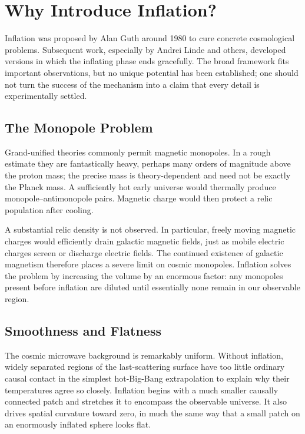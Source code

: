 \section{Why Introduce Inflation?}

Inflation was proposed by Alan Guth around 1980 to cure concrete cosmological problems. Subsequent work, especially by Andrei Linde and others, developed versions in which the inflating phase ends gracefully. The broad framework fits important observations, but no unique potential has been established; one should not turn the success of the mechanism into a claim that every detail is experimentally settled.

\subsection{The Monopole Problem}

Grand-unified theories commonly permit magnetic monopoles. In a rough estimate they are fantastically heavy, perhaps many orders of magnitude above the proton mass; the precise mass is theory-dependent and need not be exactly the Planck mass. A sufficiently hot early universe would thermally produce monopole--antimonopole pairs. Magnetic charge would then protect a relic population after cooling.

A substantial relic density is not observed. In particular, freely moving magnetic charges would efficiently drain galactic magnetic fields, just as mobile electric charges screen or discharge electric fields. The continued existence of galactic magnetism therefore places a severe limit on cosmic monopoles. Inflation solves the problem by increasing the volume by an enormous factor: any monopoles present before inflation are diluted until essentially none remain in our observable region.

\subsection{Smoothness and Flatness}

The cosmic microwave background is remarkably uniform. Without inflation, widely separated regions of the last-scattering surface have too little ordinary causal contact in the simplest hot-Big-Bang extrapolation to explain why their temperatures agree so closely. Inflation begins with a much smaller causally connected patch and stretches it to encompass the observable universe. It also drives spatial curvature toward zero, in much the same way that a small patch on an enormously inflated sphere looks flat.

